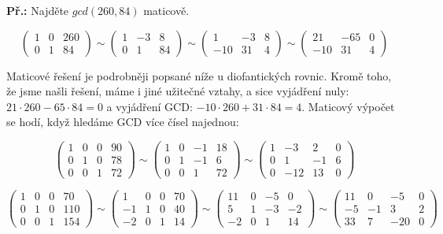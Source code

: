 \documentclass[10pt,a4paper]{article}
\begin{document}
\begin{exercise}
\textbf{Př.:} Najděte $gcd(260, 84)$ maticově.

\[ \left( \begin{array}{cc|c}
1 & 0 & 260\\
0 & 1 & 84 \end{array} \right)
%
\sim
%
\left( \begin{array}{cc|c}
1 & -3 & 8\\
0 & 1 & 84 \end{array} \right)
%
\sim
%
\left( \begin{array}{cc|c}
1 & -3 & 8\\
-10 & 31 & 4 \end{array} \right)
%
\sim
%
\left( \begin{array}{cc|c}
21 & -65 & 0\\
-10 & 31 & 4 \end{array} \right) \]

Maticové řešení je podrobněji popsané níže u diofantických rovnic. Kromě toho,
že jsme našli řešení, máme i jiné užitečné vztahy, a sice vyjádření nuly: $21
\cdot 260 - 65 \cdot 84 = 0$ a vyjádření GCD: $-10 \cdot 260 + 31 \cdot 84 = 4$.
Maticový výpočet se hodí, když hledáme GCD více čísel najednou:

\[ \left( \begin{array}{ccc|c}
1 & 0 & 0 & 90\\
0 & 1 & 0 &  78\\
0 & 0 & 1 &  72 \end{array} \right)
%
\sim
%
\left( \begin{array}{ccc|c}
1 & 0 & -1 & 18\\
0 & 1 & -1 &  6\\
0 & 0 & 1 &  72 \end{array} \right)
%
\sim
%
\left( \begin{array}{ccc|c}
1 & -3 & 2 & 0\\
0 & 1 & -1 &  6\\
0 & -12 & 13 &  0 \end{array} \right) \]

\[ \left( \begin{array}{ccc|c}
1 & 0 & 0 & 70\\
0 & 1 & 0 &  110\\
0 & 0 & 1 &  154 \end{array} \right)
%
\sim
%
\left( \begin{array}{ccc|c}
1 & 0 & 0 & 70\\
-1 & 1 & 0 &  40\\
-2 & 0 & 1 &  14 \end{array} \right)
%
\sim
%
\left( \begin{array}{ccc|c}
11 & 0 & -5 & 0\\
5 & 1 & -3 &  -2\\
-2 & 0 & 1 &  14 \end{array} \right)
%
\sim
%
\left( \begin{array}{ccc|c}
11 & 0 & -5 & 0\\
-5 & -1 & 3 &  2\\
33 & 7 & -20 &  0 \end{array} \right) \]
\end{exercise}
\end{document}
